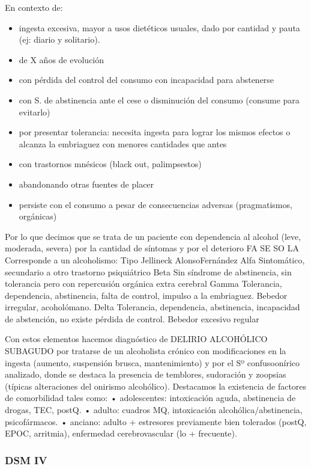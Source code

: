 \documentclass{scrbook}
\begin{document}
En contexto de:
\begin{itemize}
\item ingesta excesiva, mayor a usos dietéticos usuales, dado por cantidad y pauta (ej: diario y solitario).
\item de X años de evolución
\item con pérdida del control del consumo con incapacidad para abstenerse
\item con S. de abstinencia ante el cese o disminución del consumo (consume para evitarlo)
\item por presentar tolerancia: necesita ingesta para lograr los mismos efectos o alcanza la embriaguez con menores cantidades que antes
\item con trastornos mnésicos (black out, palimpsestos)
\item abandonando otras fuentes de placer
\item persiste con el consumo a pesar de consecuencias adversas (pragmatismos, orgánicas)
\end{itemize}
Por lo que decimos que se trata de un paciente con dependencia al alcohol (leve, moderada, severa) por la cantidad de síntomas y por el deterioro FA SE SO LA Corresponde a un alcoholismo: Tipo Jellineck Alonso\-Fernández Alfa Sintomático, secundario a otro trastorno psiquiátrico Beta Sin síndrome de abstinencia, sin tolerancia pero con repercusión orgánica extra cerebral Gamma Tolerancia, dependencia, abstinencia, falta de control, impulso a la embriaguez. Bebedor irregular, acoholómano. Delta Tolerancia, dependencia, abstinencia, incapacidad de abstención, no existe pérdida de control. Bebedor excesivo regular

Con estos elementos hacemos diagnóstico de DELIRIO ALCOHÓLICO SUBAGUDO por tratarse de un alcoholista crónico con modificaciones en la ingesta (aumento, suspensión brusca, mantenimiento) y por el Sº confuso\-onírico analizado, donde se destaca la presencia de temblores, sudoración y zoopsias (típicas alteraciones del onirismo alcohólico). Destacamos la existencia de factores de comorbilidad tales como: • adolescentes: intoxicación aguda, abstinencia de drogas, TEC, postQ. • adulto: cuadros MQ, intoxicación alcohólica/abstinencia, psicofármacos. • anciano: adulto + estresores previamente bien tolerados (postQ, EPOC, arritmia), enfermedad cerebrovascular (lo + frecuente).
\subsubsection{DSM IV}
\end{document}
